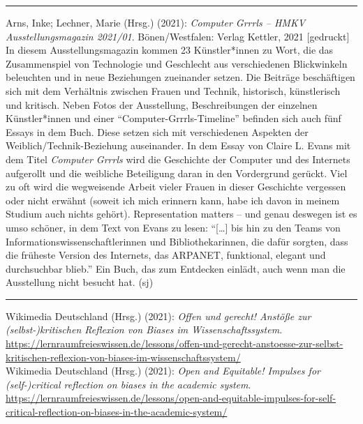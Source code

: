 \documentclass[a4paper,
fontsize=11pt,
oneside,
numbers=noperiodatend,
parskip=half-,
bibliography=totoc,
final
]{scrartcl}
\begin{document}
\begin{center}\rule{0.5\linewidth}{0.5pt}\end{center}

Arns, Inke; Lechner, Marie (Hrsg.) (2021): \emph{Computer Grrrls -- HMKV
Ausstellungsmagazin 2021/01}. Bönen/Westfalen: Verlag Kettler, 2021
{[}gedruckt{]}\\
In diesem Ausstellungsmagazin kommen 23 Künstler*innen zu Wort, die das
Zusammenspiel von Technologie und Geschlecht aus verschiedenen
Blickwinkeln beleuchten und in neue Beziehungen zueinander setzen. Die
Beiträge beschäftigen sich mit dem Verhältnis zwischen Frauen und
Technik, historisch, künstlerisch und kritisch. Neben Fotos der
Ausstellung, Beschreibungen der einzelnen Künstler*innen und einer
\enquote{Computer-Grrrls-Timeline} befinden sich auch fünf Essays in dem
Buch. Diese setzen sich mit verschiedenen Aspekten der
Weiblich/Technik-Beziehung auseinander. In dem Essay von Claire L. Evans
mit dem Titel \emph{Computer Grrrls} wird die Geschichte der Computer
und des Internets aufgerollt und die weibliche Beteiligung daran in den
Vordergrund gerückt. Viel zu oft wird die wegweisende Arbeit vieler
Frauen in dieser Geschichte vergessen oder nicht erwähnt (soweit ich
mich erinnern kann, habe ich davon in meinem Studium auch nichts
gehört). Representation matters -- und genau deswegen ist es umso
schöner, in dem Text von Evans zu lesen: \enquote{[\ldots] bis hin zu den
Teams von Informationswissenschaftlerinnen und Bibliothekarinnen, die
dafür sorgten, dass die früheste Version des Internets, das ARPANET,
funktional, elegant und durchsuchbar blieb.} Ein Buch, das zum
Entdecken einlädt, auch wenn man die Ausstellung nicht besucht hat. (sj)

\begin{center}\rule{0.5\linewidth}{0.5pt}\end{center}

Wikimedia Deutschland (Hrsg.) (2021): \emph{Offen und gerecht! Anstöße
zur (selbst-)kritischen Reflexion von Biases im Wissenschaftssystem}.
\url{https://lernraumfreieswissen.de/lessons/offen-und-gerecht-anstoesse-zur-selbst-kritischen-reflexion-von-biases-im-wissenschaftssystem/}\\
Wikimedia Deutschland (Hrsg.) (2021): \emph{Open and Equitable! Impulses
for (self-)critical reflection on biases in the academic system}.
\url{https://lernraumfreieswissen.de/lessons/open-and-equitable-impulses-for-self-critical-reflection-on-biases-in-the-academic-system/}\\
\end{document}
